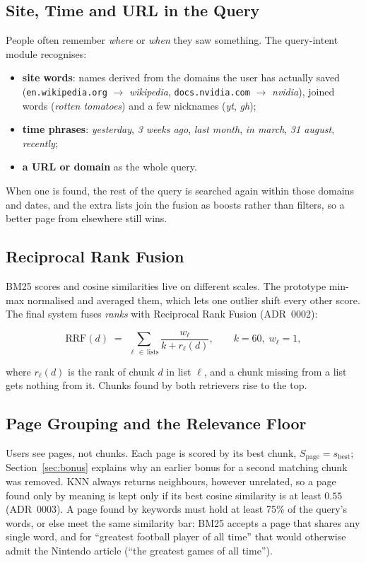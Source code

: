 \subsection{Site, Time and URL in the Query}

People often remember \emph{where} or \emph{when} they saw something. The
query-intent module recognises:

\begin{itemize}
  \item \textbf{site words}: names derived from the domains the user has
  actually saved (\texttt{en.wikipedia.org} $\rightarrow$ \textit{wikipedia},
  \texttt{docs.nvidia.com} $\rightarrow$ \textit{nvidia}), joined words
  (\textit{rotten tomatoes}) and a few nicknames (\textit{yt}, \textit{gh});
  \item \textbf{time phrases}: \textit{yesterday}, \textit{3 weeks ago},
  \textit{last month}, \textit{in march}, \textit{31 august}, \textit{recently};
  \item \textbf{a URL or domain} as the whole query.
\end{itemize}

When one is found, the rest of the query is searched again within those
domains and dates, and the extra lists join the fusion as boosts rather than
filters, so a better page from elsewhere still wins.

\subsection{Reciprocal Rank Fusion}

BM25 scores and cosine similarities live on different scales. The prototype
min-max normalised and averaged them, which lets one outlier shift every
other score. The final system fuses \emph{ranks} with Reciprocal Rank Fusion
\cite{cormack2009rrf} (ADR~0002):

\[
\mathrm{RRF}(d) \;=\; \sum_{\ell \,\in\, \text{lists}} \frac{w_\ell}{k + r_\ell(d)},
\qquad k = 60,\; w_\ell = 1,
\]

where $r_\ell(d)$ is the rank of chunk $d$ in list $\ell$, and a chunk
missing from a list gets nothing from it. Chunks found by both retrievers
rise to the top.

\subsection{Page Grouping and the Relevance Floor}

Users see pages, not chunks. Each page is scored by its best chunk,
$S_{\text{page}} = s_{\text{best}}$; Section~\ref{sec:bonus} explains why an
earlier bonus for a second matching chunk was removed. KNN always returns
neighbours, however unrelated, so a page found only by meaning is kept only
if its best cosine similarity is at least $0.55$ (ADR~0003). A page found by
keywords must hold at least 75\% of the query's words, or else meet the same
similarity bar: BM25 accepts a page that shares any single word, and for
``greatest football player of all time'' that would otherwise admit the
Nintendo article (``the greatest games of all time'').

